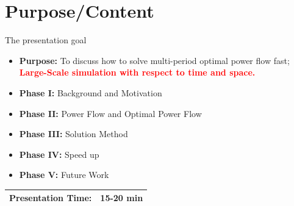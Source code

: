 \documentclass{beamer}
\begin{document}
\begin{frame}
\titlepage
\end{frame}





\section{Purpose/Content}
\begin{frame}{The presentation goal}
\begin{itemize}
\item \textbf{Purpose:} To discuss how to solve multi-period optimal power flow fast; \textcolor{red}{\textbf{Large-Scale simulation with respect to time and space.}}
\item \textbf{Phase I:} Background and Motivation
\item \textbf{Phase II:} Power Flow and Optimal Power Flow
\item \textbf{Phase III:} Solution Method
\item \textbf{Phase IV:} Speed up
\item \textbf{Phase V:} Future Work

\end{itemize}
\begin{center}
\begin{tabular}{|l l|} 
\hline
\textbf{Presentation Time:}& 15-20 min \\
\hline
\end{tabular}
\end{center}
\end{frame}


\begin{frame}[plain]

\end{frame}
\end{document}
